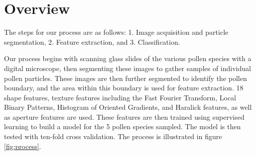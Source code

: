 \section{Overview} 

The steps for our process are as follows: 1. Image acquisition and particle segmentation, 2. Feature extraction, and 3. Classification.

Our process begins with scanning glass slides of the various pollen species with a digital microscope, then segmenting these images to gather samples of individual pollen particles. These images are then further segmented to identify the pollen boundary, and the area within this boundary is used for feature extraction. 18 shape features, texture features including the Fast Fourier Transform, Local Binary Patterns, Histogram of Oriented Gradients, and Haralick features, as well as aperture features are used. These features are then trained using supervised learning to build a model for the 5 pollen species sampled. The model is then tested with ten-fold cross validation. The process is illustrated in figure \ref{fig:process}. 
    
    
    
    
    
    
    
    
    
    
    
    
  
  
  
  
  
  
  
  
  
  
  
  
  
  
  
  
  